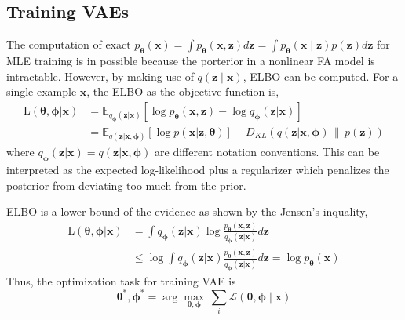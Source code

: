 \documentclass[11pt]{article}
\begin{document}
\subsection*{Training VAEs}
The computation of exact $p_{\boldsymbol{\theta}}(\boldsymbol{x}) = \int p_{\boldsymbol{\theta}}(\boldsymbol{x}, \boldsymbol{z}) d\boldsymbol z = \int p_{\boldsymbol{\theta}}(\boldsymbol{x} \mid \boldsymbol{z}) p(\boldsymbol{z}) d\boldsymbol{z}$ for MLE training is in possible because the porterior in a nonlinear FA model is intractable. However, by making use of $q(\boldsymbol{z} \mid \boldsymbol{x})$, ELBO can be computed. For a single example $\boldsymbol{x}$, the ELBO as the objective function is,
\[
\begin{aligned}
\text{L}(\boldsymbol{\theta}, \boldsymbol{\phi} | \boldsymbol{x}) &= \mathbb{E}_{q_{\boldsymbol{\phi}}(\boldsymbol{z}|\boldsymbol{x})} \left[ \log p_{\boldsymbol{\theta}}(\boldsymbol{x}, \boldsymbol{z}) - \log q_{\boldsymbol{\phi}}(\boldsymbol{z}|\boldsymbol{x}) \right] \\
&= \mathbb{E}_{q(\boldsymbol{z}|\boldsymbol{x}, \boldsymbol{\phi})} \left[ \log p(\boldsymbol{x}|\boldsymbol{z}, \boldsymbol{\theta}) \right] - D_{KL} \left( q(\boldsymbol{z}|\boldsymbol{x}, \boldsymbol{\phi}) \, \| \, p(\boldsymbol{z}) \right)
\end{aligned}
\]
where $q_{\boldsymbol{\phi}}(\boldsymbol{z}|\boldsymbol{x}) = q(\boldsymbol{z}|\boldsymbol{x}, \boldsymbol{\phi})$ are different notation conventions. This can be interpreted as the expected log-likelihood plus a regularizer which penalizes the posterior from deviating too much from the prior.

ELBO is a lower bound of the evidence as shown by the Jensen's inquality,
\[
\begin{aligned}
\text{L}(\boldsymbol{\theta}, \boldsymbol{\phi} | \boldsymbol{x}) &= \int q_{\boldsymbol{\phi}}(\boldsymbol{z}|\boldsymbol{x}) \log \frac{p_{\boldsymbol{\theta}}(\boldsymbol{x}, \boldsymbol{z})}{q_{\boldsymbol{\phi}}(\boldsymbol{z}|\boldsymbol{x})} d\boldsymbol{z} \\
&\leq \log \int q_{\boldsymbol{\phi}}(\boldsymbol{z}|\boldsymbol{x}) \frac{p_{\boldsymbol{\theta}}(\boldsymbol{x}, \boldsymbol{z})}{q_{\boldsymbol{\phi}}(\boldsymbol{z}|\boldsymbol{x})} d\boldsymbol{z} = \log p_{\boldsymbol{\theta}}(\boldsymbol{x})
\end{aligned}
\]
Thus, the optimization task for training VAE is 
\[
\boldsymbol{\theta}^*, \boldsymbol{\phi}^* = \arg\max_{\boldsymbol{\theta}, \boldsymbol{\phi}} \, \sum_i \mathcal{L}(\boldsymbol{\theta}, \boldsymbol{\phi} \mid \boldsymbol{x})
\]
\end{document}
